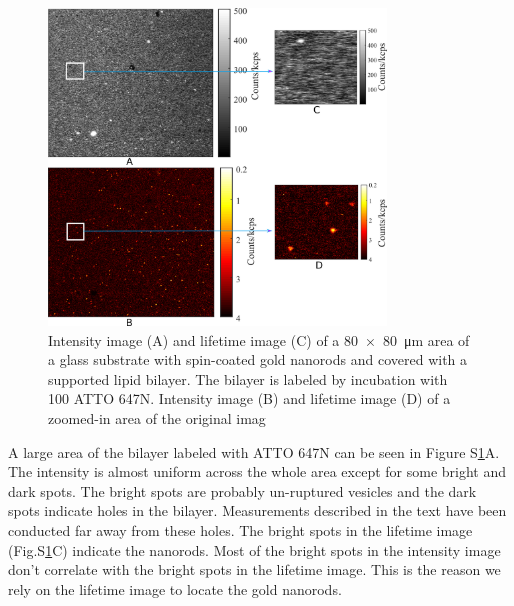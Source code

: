 \documentclass[11pt,a4paper,onecolumn]{article}
\begin{document}
\begin{figure}[ht]
  \centering
  \includegraphics[width=0.8\textwidth]{xy_with_zoom.png}
  \makeatletter
  \renewcommand{\fnum@figure}{\figurename~S\thefigure}
  \makeatother{}
  \caption{ Intensity image (A) and lifetime image (C) of a \SI[product-units=repeat]{80x80}{\um} area of a glass substrate with spin-coated gold nanorods and covered with a supported lipid bilayer.
  The bilayer is labeled by incubation with \SI{100}{\nM} ATTO 647N.
  Intensity image (B) and lifetime image (D) of a zoomed-in area of the original imag}
  \label{SIfig:xy-scan}
\end{figure}

A large area of the bilayer labeled with ATTO 647N can be seen in Figure S\ref{SIfig:xy-scan}A.
The intensity is almost uniform across the whole area except for some bright and dark spots.
The bright spots are probably un-ruptured vesicles and the dark spots indicate holes in the bilayer.
Measurements described in the text have been conducted far away from these holes.
The bright spots in the lifetime image (Fig.S\ref{SIfig:xy-scan}C) indicate the nanorods.
Most of the bright spots in the intensity image don't correlate with the bright spots in the lifetime image.
This is the reason we rely on the lifetime image to locate the gold nanorods.\\

\newpage
\end{document}
